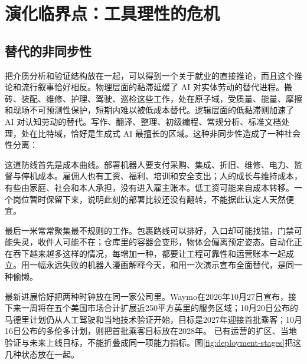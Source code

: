 \section{演化临界点：工具理性的危机}

\subsection{替代的非同步性}

把介质分析和验证结构放在一起，可以得到一个关于就业的直接推论，而且这个推论和流行叙事恰好相反。物理层面的黏滞延缓了 AI 对实体劳动的替代进程。搬砖、装配、维修、护理、驾驶、巡检这些工作，处在原子域，受质量、能量、摩擦和现场不可预测性保护，短期内难以被低成本替代。逻辑层面的低黏滞则加速了 AI 对认知劳动的替代。写作、翻译、整理、初级编程、常规分析、标准文档处理，处在比特域，恰好是生成式 AI 最擅长的区域。这种非同步性造成了一种社会性分离：


这道防线首先是成本曲线。部署机器人要支付采购、集成、折旧、维修、电力、监督与停机成本。雇佣人也有工资、福利、培训和安全支出；人的成长与维持成本，有些由家庭、社会和本人承担，没有进入雇主账本。低工资可能来自成本转移。一个岗位暂时保留下来，说明此刻的部署比较还没有翻转，不能据此认定人天然便宜。

最后一米常常聚集最不规则的工作。包裹路线可以排好，入口却可能找错，门禁可能失灵，收件人可能不在；仓库里的容器会变形，物体会偏离预定姿态。自动化正在吞下越来越多这样的情况，每增加一种，都要让工程可靠性和运营账本一起成立。用一幅永远失败的机器人漫画解释今天，和用一次演示宣布全面替代，是同一种偷懒。

最新进展恰好把两种时钟放在同一家公司里。Waymo在2026年10月27日宣布，接下来一周将在五个美国市场合计扩展近250平方英里的服务区域；10月20日公布的马德里计划仍从人工驾驶和当地技术验证开始，目标是2027年迎接首批乘客；10月16日公布的多伦多计划，则把首批乘客目标放在2028年。\cite{waymo2026expansion,waymo2026madrid,waymo2026toronto} 已有运营的扩区、当地验证与未来上线目标，不能折叠成同一项能力指标。图\ref{fig:deployment-stages}把这几种状态放在一起。

